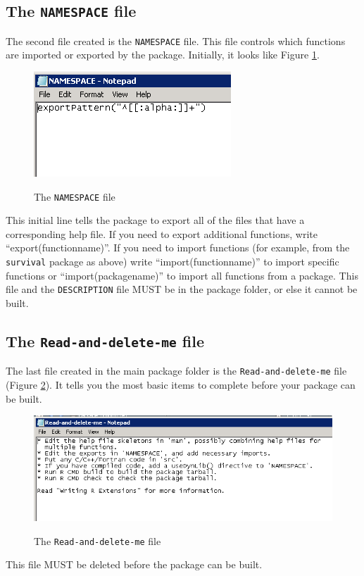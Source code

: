 \documentclass{article}
\begin{document}
\subsection{The \texttt{NAMESPACE} file}
The second file created is the \texttt{NAMESPACE} file. This file controls which functions are imported or exported by the package. Initially, it looks like Figure \ref{namespace}.
\begin{figure}[h]
\caption{The \texttt{NAMESPACE} file}
\includegraphics{namespace.png}
\label{namespace}
\end{figure}
This initial line tells the package to export all of the files that have a corresponding help file. If you need to export additional functions, write ``export(functionname)''. If you need to import functions (for example, from the \texttt{survival} package as above) write ``import(functionname)'' to import specific functions or ``import(packagename)'' to import all functions from a package. This file and the \texttt{DESCRIPTION} file MUST be in the package folder, or else it cannot be built.

\subsection{The \texttt{Read-and-delete-me} file}
The last file created in the main package folder is the \texttt{Read-and-delete-me} file (Figure \ref{read-and-delete}). It tells you the most basic items to complete before your package can be built.
\begin{figure}[h]
\caption{The \texttt{Read-and-delete-me} file}
\includegraphics{read-and-delete.png}
\label{read-and-delete}
\end{figure}
This file MUST be deleted before the package can be built.
\clearpage
\end{document}

